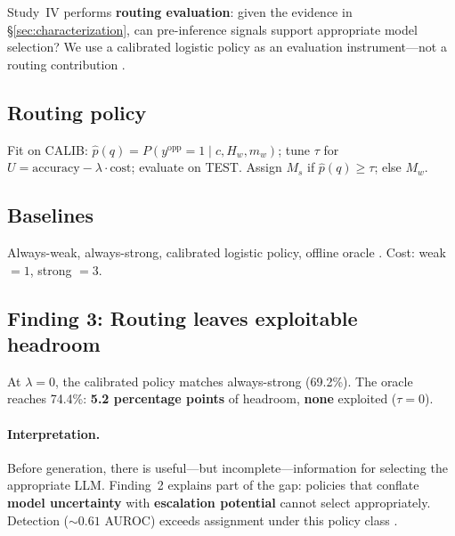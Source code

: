 
Study~IV performs \textbf{routing evaluation}: given the evidence in \S\ref{sec:characterization}, can pre-inference signals support appropriate model selection?
We use a calibrated logistic policy as an evaluation instrument---not a routing contribution \citep{cao2026scope}.

\subsection{Routing policy}
\label{sec:routing:policy}

Fit on CALIB: $\hat{p}(q) = P(y^{\text{opp}}{=}1 \mid c, H_w, m_w)$; tune $\tau$ for $U = \text{accuracy} - \lambda \cdot \text{cost}$; evaluate on TEST.
Assign $M_s$ if $\hat{p}(q) \geq \tau$; else $M_w$.

\subsection{Baselines}
\label{sec:routing:baselines}

Always-weak, always-strong, calibrated logistic policy, offline oracle \citep{hu2024routerbench}.
Cost: weak $=1$, strong $=3$.

\subsection{Finding 3: Routing leaves exploitable headroom}
\label{sec:routing:results}



At $\lambda{=}0$, the calibrated policy matches always-strong (69.2\%).
The oracle reaches 74.4\%: \textbf{5.2 percentage points} of headroom, \textbf{none} exploited ($\tau{=}0$).

\paragraph{Interpretation.}
Before generation, there is useful---but incomplete---information for selecting the appropriate LLM.
Finding~2 explains part of the gap: policies that conflate \textbf{model uncertainty} with \textbf{escalation potential} cannot select appropriately.
Detection (${\sim}0.61$ AUROC) exceeds assignment under this policy class \citep{plaut2024chat,hu2024routerbench}.
